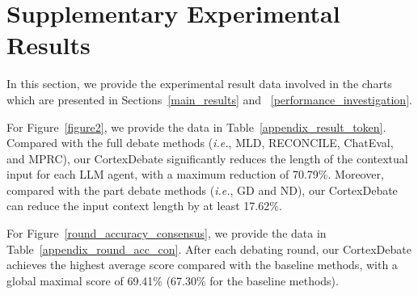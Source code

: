 \section{Supplementary Experimental Results}
\label{appendix_additional_results}

In this section, we provide the experimental result data involved in the charts which are presented in Sections~\ref{main_results} and ~\ref{performance_investigation}.

\renewcommand{\dblfloatpagefraction}{.9}



For Figure~\ref{figure2}, we provide the data in Table~\ref{appendix_result_token}. Compared with the full debate methods (\textit{i.e.}, MLD, RECONCILE, ChatEval, and MPRC), our CortexDebate significantly reduces the length of the contextual input for each LLM agent, with a maximum reduction of 70.79\%. Moreover, compared with the part debate methods (\textit{i.e.}, GD and ND), our CortexDebate can reduce the input context length by at least 17.62\%.

For Figure~\ref{round_accuracy_consensus}, we provide the data in Table~\ref{appendix_round_acc_con}. After each debating round, our CortexDebate achieves the highest average score compared with the baseline methods, with a global maximal score of 69.41\% (67.30\% for the baseline methods).